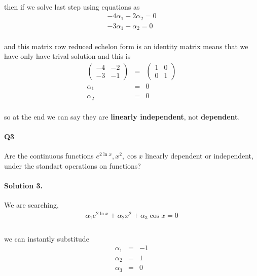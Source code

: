 \documentclass[11pt]{article}
\begin{document}
\paragraph{}then if we solve last step using equations as
\begin{eqnarray*}
-4\alpha_1 -2\alpha_2 =0\\
-3\alpha_1-\alpha_2 =0
\end{eqnarray*}
\paragraph{}and this matrix row reduced echelon form is an identity matrix means that we have only have trival solution and this is 
\begin{eqnarray*}
\begin{pmatrix}
-4 & -2\\
-3 & -1
\end{pmatrix}
&=&
\begin{pmatrix}
1 & 0\\
0 & 1
\end{pmatrix}\\
\alpha_1 &=&0\\
\alpha_2 &=&0
\end{eqnarray*}
\paragraph{}so at the end we can say they are \textbf{linearly independent}, not \textbf{dependent}.
\paragraph{Q3}Are the continuous functions $ e^{2\ln x}, x^2 , \cos x $ linearly dependent or independent, under the standart operations on functions?
\paragraph{Solution 3.}We are searching,
\begin{eqnarray*}
\alpha_1 e^{2\ln x} + \alpha_2 x^2 + \alpha_3 \cos x=0\\
\end{eqnarray*}
\paragraph{}we can instantly substitude 
\begin{eqnarray*}
\alpha_1 &=& -1\\
\alpha_2 &=& 1\\
\alpha_3 &=& 0
\end{eqnarray*}
\end{document}
